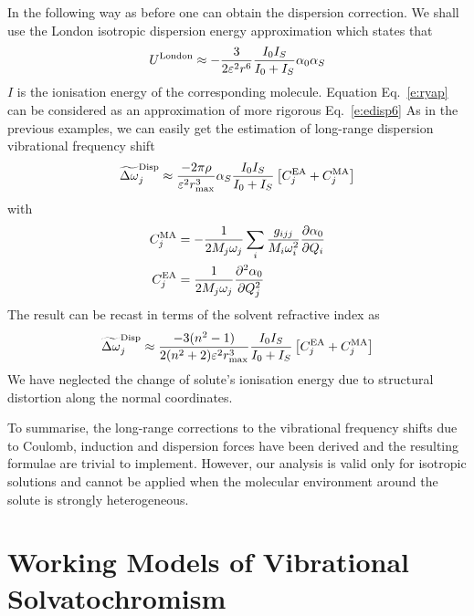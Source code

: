 \documentclass[b5paper,oneside,fleqn,11pt]{book}
\newcommand{\fderiv}[2]{\ensuremath{
    \frac{\partial #1}{\partial #2}}}
\newcommand{\sderiv}[2]{\ensuremath{
    \frac{\partial^2 #1}{\partial #2^2}
    }}
\begin{document}
\begin{refsection}
In the following way as before one can obtain the
dispersion correction. We shall use the London isotropic
dispersion energy approximation which states that \citep{London.TransFaradSoc.1937}
%
\begin{equation} \label{e:ryap}
 U^{\rm London} \approx -\frac{3}{2\varepsilon^2 r^6} \frac{I_0I_S}{I_0+I_S} \alpha_0 \alpha_S
\end{equation}
%
$I$ is the ionisation energy of the corresponding
molecule. Equation Eq.~\eqref{e:ryap}
can be considered as an approximation of more rigorous Eq.~\eqref{e:edisp6}
As in the previous examples, we can easily get the estimation of
long\hyp{}range dispersion vibrational frequency shift
%
\begin{equation} \label{e:x123413}
 \widetilde{\Delta \omega}_j^{\rm Disp} \approx
\frac{-2\pi\rho}{\varepsilon^2 r_{\max}^3} \alpha_S \frac{I_0I_S}{I_0+I_S} \left[ C_j^{\rm EA} + C_j^{\rm MA} \right]
\end{equation}
%
with
%
\begin{subequations}
\begin{align}
  C_j^{\rm MA} &= -\frac{1}{2M_j\omega_j}\sum_i \frac{g_{ijj}}{M_i\omega_i^2} \fderiv{\alpha_0}{Q_i}\\
  C_j^{\rm EA} &= \frac{1}{2M_j\omega_j} \sderiv{\alpha_0}{Q_j}
\end{align}
\end{subequations}
%
The result
can be recast in terms of the solvent refractive index
as
%
\begin{equation} \label{e:x1234161}
 \widetilde{\Delta \omega}_j^{\rm Disp} \approx
\frac{-3(n^2-1)}{2(n^2+2)\varepsilon^2 r_{\max}^3} \frac{I_0I_S}{I_0+I_S} \left[ C_j^{\rm EA} + C_j^{\rm MA} \right]
\end{equation}
%
We have neglected the change of solute's ionisation energy due to structural
distortion along the normal coordinates. 

To summarise, the long\hyp{}range corrections to the vibrational
frequency shifts due to Coulomb, induction and dispersion forces
have been derived and the resulting formulae are trivial to implement.
However, our analysis is valid only for isotropic solutions and cannot be 
applied when the molecular environment around the solute is strongly heterogeneous.

\section{Working Models of Vibrational Solvatochromism\label{s:solx-models-working}}


\end{refsection}
\end{document}
